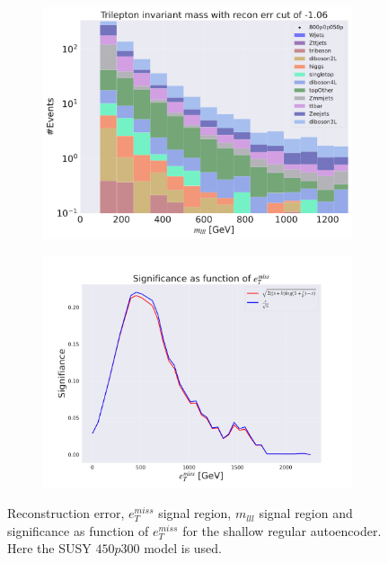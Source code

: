 \begin{figure}[H]
    \hfill
    \begin{subfigure}{.49\textwidth}
        \includegraphics[width=\textwidth]{Figures/AE_testing/small/3lep/b_data_recon_big_rm3_feats_sig_800p0p050p_mlll_recon_errcut_-1.06.pdf}
        \caption{}
        \label{fig:AE_3lep_small_mlll_800_2}
    \end{subfigure}
    \hfill   
    \begin{subfigure}{.49\textwidth}
        \includegraphics[width=\textwidth]{Figures/AE_testing/small/3lep/significance_etmiss_800p0p050p_-1.0567039801896674.pdf}
        \caption{}
        \label{fig:AE_3lep_small_signi_800_2}
    \end{subfigure}
    \hfill      
    \caption[3lep shallow network | $800p50$ | AE | 2]{Reconstruction error, $e_T^{miss}$ signal region, $m_{lll}$ signal region and significance as function of 
    $e_T^{miss}$ for the shallow regular autoencoder. Here the SUSY $450p300$ model is used.}
    \label{fig:AE_3lep_small_rec_sig_signi_800_2}
\end{figure}












